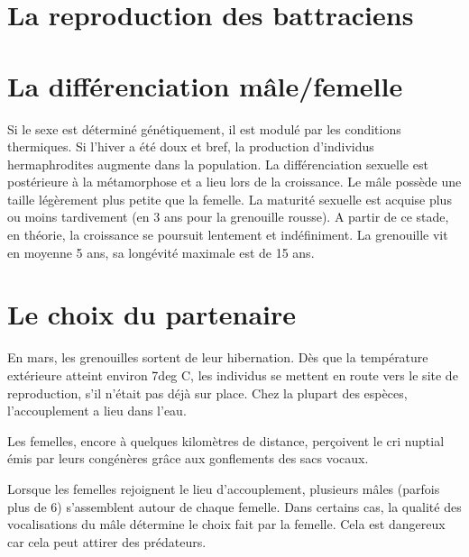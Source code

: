 \section{La reproduction des battraciens}



\section{La différenciation mâle/femelle}

Si le sexe est déterminé génétiquement, il est modulé par les conditions thermiques. Si l’hiver a été doux et bref, la production d’individus hermaphrodites augmente dans la population.
La différenciation sexuelle est postérieure à la métamorphose et a lieu lors de la croissance.
Le mâle possède une taille légèrement plus petite que la femelle.
La maturité sexuelle est acquise plus ou moins tardivement (en 3 ans pour la grenouille rousse). A partir de ce stade, en théorie, la croissance se poursuit lentement et indéfiniment. La grenouille vit en moyenne 5 ans, sa longévité maximale est de 15 ans.
        
\section{Le choix du partenaire}
En mars, les grenouilles sortent de leur hibernation.  Dès que la température extérieure atteint environ 7deg C, les individus se mettent en route vers le site de reproduction, s’il n’était pas déjà sur place. Chez la plupart des espèces, l’accouplement a lieu dans l’eau.

Les femelles, encore à quelques kilomètres de distance, perçoivent le cri nuptial émis par leurs congénères grâce aux gonflements des sacs vocaux.




 

        Lorsque les femelles rejoignent le lieu d’accouplement, plusieurs mâles (parfois plus de 6) s’assemblent autour de chaque femelle. Dans certains cas, la qualité des vocalisations du mâle détermine le choix fait par la femelle. Cela est dangereux car cela peut attirer des prédateurs.

